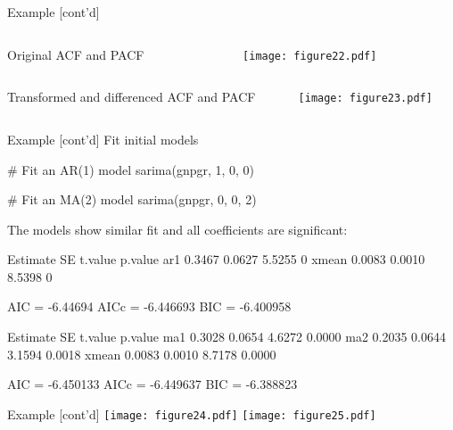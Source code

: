 \documentclass[ignorenonframetext,xcolor=x11names]{beamer}
\begin{document}
\begin{frame}{Example \small [cont'd]}
\begin{columns}
\begin{column}{0.15\textwidth}
\small
Original ACF and PACF
\end{column}
\begin{column}{0.75\textwidth}
\texttt{[image: figure22.pdf]}
\end{column}
\end{columns}

\begin{columns}
\begin{column}{0.15\textwidth}
\small
Transformed and differenced ACF and PACF
\end{column}
\begin{column}{0.75\textwidth}
\texttt{[image: figure23.pdf]}
\end{column}
\end{columns}
\end{frame}

\begin{frame}[fragile]{Example \small [cont'd]}
Fit initial models
\begin{Rcode}
# Fit an AR(1) model
sarima(gnpgr, 1, 0, 0)

# Fit an MA(2) model
sarima(gnpgr, 0, 0, 2)
\end{Rcode}

The models show similar fit and all coefficients are significant:
\begin{textcode}
      Estimate     SE t.value p.value
ar1     0.3467 0.0627  5.5255       0
xmean   0.0083 0.0010  8.5398       0
 
AIC = -6.44694  AICc = -6.446693  BIC = -6.400958 
\end{textcode}

\begin{textcode}
      Estimate     SE t.value p.value
ma1     0.3028 0.0654  4.6272  0.0000
ma2     0.2035 0.0644  3.1594  0.0018
xmean   0.0083 0.0010  8.7178  0.0000

AIC = -6.450133  AICc = -6.449637  BIC = -6.388823 
\end{textcode}
\end{frame}

\begin{frame}{Example \small [cont'd]}
\centering
\texttt{[image: figure24.pdf]}
\texttt{[image: figure25.pdf]}
\end{frame}
\end{document}
